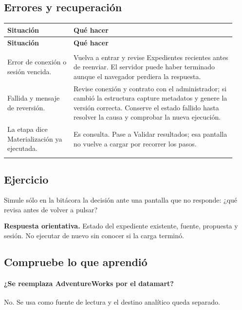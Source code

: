 \subsection{Errores y recuperación}
\begingroup
\fontsize{10}{12.5}\selectfont
\setlength{\tabcolsep}{5pt}
\renewcommand{\arraystretch}{1.15}
\begin{longtable}{@{}>{\RaggedRight\arraybackslash}p{0.27\linewidth}>{\RaggedRight\arraybackslash}p{0.66\linewidth}@{}}
\toprule
\textbf{Situación} & \textbf{Qué hacer} \\
\midrule
\endfirsthead
\toprule
\textbf{Situación} & \textbf{Qué hacer} \\
\midrule
\endhead
\midrule
\multicolumn{2}{r}{\footnotesize Continúa en la página siguiente}\\
\endfoot
\bottomrule
\endlastfoot
Error de conexión o sesión vencida. & Vuelva a entrar y revise Expedientes recientes antes de reenviar. El servidor puede haber terminado aunque el navegador perdiera la respuesta. \\
\addlinespace[3pt]
Fallida y mensaje de reversión. & Revise conexión y contrato con el administrador; si cambió la estructura capture metadatos y genere la versión correcta. Conserve el estado fallido hasta resolver la causa y comprobar la nueva ejecución. \\
\addlinespace[3pt]
La etapa dice Materialización ya ejecutada. & Es consulta. Pase a Validar resultados; esa pantalla no vuelve a cargar por recorrer los pasos. \\
\addlinespace[3pt]
\end{longtable}
\endgroup

\subsection{Ejercicio}
Simule sólo en la bitácora la decisión ante una pantalla que no responde: ¿qué revisa antes de volver a pulsar?

\textbf{Respuesta orientativa.} Estado del expediente existente, fuente, propuesta y sesión. No ejecutar de nuevo sin conocer si la carga terminó.

\subsection{Compruebe lo que aprendió}
\paragraph{¿Se reemplaza AdventureWorks por el datamart?} No. Se usa como fuente de lectura y el destino analítico queda separado.

